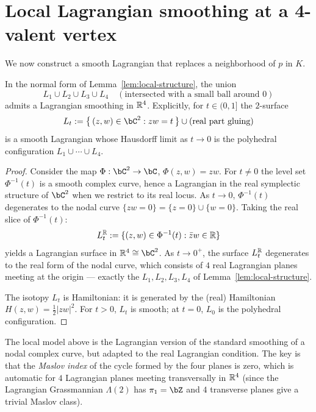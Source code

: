 \section{Local Lagrangian smoothing at a 4-valent vertex}

We now construct a smooth Lagrangian that replaces a neighborhood of $p$ in $K$.

\begin{lemma}\label{lem:local-smoothing}
In the normal form of Lemma~\ref{lem:local-structure}, the union
\[
   L_1\cup L_2\cup L_3\cup L_4 \quad (\text{intersected with a small ball around 0})
\]
admits a Lagrangian smoothing in $\mathbb{R}^4$. Explicitly, for $t\in(0,1]$ the $2$-surface
\[
   L_t := \bigl\{\,(z,w)\in\bC^2 : z w = t\,\bigr\}\cup (\text{real part gluing})
\]
is a smooth Lagrangian whose Hausdorff limit as $t\to 0$ is the polyhedral configuration $L_1\cup\cdots\cup L_4$.
\end{lemma}

\begin{proof}
Consider the map $\Phi:\bC^2\to\bC$, $\Phi(z,w)=zw$. For $t\neq 0$ the level set $\Phi^{-1}(t)$ is a smooth complex curve, hence a Lagrangian in the real symplectic structure of $\bC^2$ when we restrict to its real locus. As $t\to 0$, $\Phi^{-1}(t)$ degenerates to the nodal curve $\{zw=0\}=\{z=0\}\cup\{w=0\}$. Taking the real slice of $\Phi^{-1}(t)$:
\[
   L_t^{\mathbb{R}} := \{(z,w)\in\Phi^{-1}(t): \bar z w \in \mathbb{R}\}
\]
yields a Lagrangian surface in $\bR^4\cong\bC^2$. As $t\to 0^+$, the surface $L_t^{\mathbb{R}}$ degenerates to the real form of the nodal curve, which consists of $4$ real Lagrangian planes meeting at the origin --- exactly the $L_1,L_2,L_3,L_4$ of Lemma~\ref{lem:local-structure}.

The isotopy $L_t$ is Hamiltonian: it is generated by the (real) Hamiltonian $H(z,w) = \tfrac12|zw|^2$. For $t>0$, $L_t$ is smooth; at $t=0$, $L_0$ is the polyhedral configuration.
\end{proof}

\begin{remark}
The local model above is the Lagrangian version of the standard smoothing of a nodal complex curve, but adapted to the real Lagrangian condition. The key is that the \emph{Maslov index} of the cycle formed by the four planes is zero, which is automatic for $4$ Lagrangian planes meeting transversally in $\mathbb{R}^4$ (since the Lagrangian Grassmannian $\Lambda(2)$ has $\pi_1=\bZ$ and $4$ transverse planes give a trivial Maslov class).
\end{remark}

